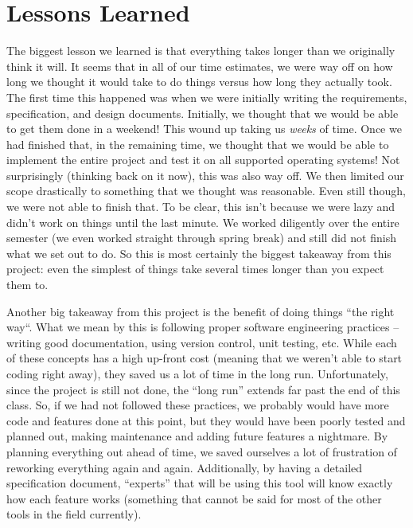 \documentclass[letterpaper,12pt]{article}
\begin{document}
\section{Lessons Learned} \label{lessons}
The biggest lesson we learned is that everything takes longer than we originally
think it will.  It seems that in all of our time estimates, we were way off on
how long we thought it would take to do things versus how long they actually
took.  The first time this happened was when we were initially writing the
requirements, specification, and design documents.  Initially, we thought that
we would be able to get them done in a weekend!  This wound up taking us
\textit{weeks} of time.  Once we had finished that, in the remaining time, we
thought that we would be able to implement the entire project and test it on all
supported operating systems!  Not surprisingly (thinking back on it now), this
was also way off.  We then limited our scope drastically to something that we
thought was reasonable.  Even still though, we were not able to finish that.  To
be clear, this isn't because we were lazy and didn't work on things until the
last minute.  We worked diligently over the entire semester (we even worked
straight through spring break) and still did not finish what we set out to do. 
So this is most certainly the biggest takeaway from this project: even the
simplest of things take several times longer than you expect them to.

Another big takeaway from this project is the benefit of doing things ``the
right way``.  What we mean by this is following proper software engineering
practices -- writing good documentation, using version control, unit testing,
etc.  While each of these concepts has a high up-front cost (meaning that we
weren't able to start coding right away), they saved us a lot of time in the
long run.  Unfortunately, since the project is still not done, the ``long run''
extends far past the end of this class.  So, if we had not followed these
practices, we probably would have more code and features done at this point, but
they would have been poorly tested and planned out, making maintenance and
adding future features a nightmare.  By planning everything out ahead of time,
we saved ourselves a lot of frustration of reworking everything again and again.
 Additionally, by having a detailed specification document, ``experts'' that
will be using this tool will know exactly how each feature works (something that
cannot be said for most of the other tools in the field currently).
\end{document}

